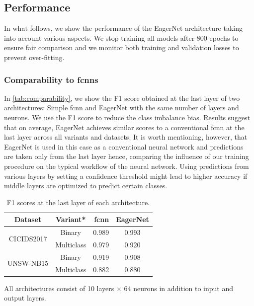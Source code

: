 \documentclass[conference]{IEEEtran}
\newcommand{\mynote}[3]{
    \fbox{\bfseries\sffamily\scriptsize#1}
    {\small$\blacktriangleright$\textsf{\emph{\color{#3}{#2}}}$\blacktriangleleft$}}
\newcommand{\todo}[1]{\mynote{TODO}{#1}{red}}
\begin{document}
\subsection{Performance}

In what follows, we show the performance of the EagerNet architecture taking into account various aspects. We stop training all models after 800 epochs to ensure fair comparison and we monitor both training and validation losses to prevent over-fitting.

\subsubsection{Comparability to \glspl{fcnn}}
\label{subsubsec:comparability_to_fnns}

In \autoref{tab:comparability}, we show the F1 score obtained at the last layer of two architectures: Simple \gls{fcnn} and EagerNet with the same number of layers and neurons. We use the F1 score to reduce the class imbalance bias. Results suggest that on average, EagerNet achieves similar scores to a conventional \gls{fcnn} at the last layer across all variants and datasets. It is worth mentioning, however, that EagerNet is used in this case as a conventional neural network and predictions are taken only from the last layer hence, comparing the influence of our training procedure on the typical workflow of the neural network. Using predictions from various layers by setting a confidence threshold might lead to higher accuracy if middle layers are optimized to predict certain classes.

\begin{table}[H]

\centering
\begin{tabular}{ccrc}
\toprule
\textbf{Dataset} & \textbf{Variant*} & \textbf{\gls{fcnn}} & \textbf{EagerNet} \\
\midrule
\multirow{2}{*}{CICIDS2017} & Binary & 0.989 & 0.993 \\
 & Multiclass & 0.979 & 0.920 \\
\midrule
\multirow{2}{*}{UNSW-NB15} & Binary & 0.919 & 0.908 \\
 & Multiclass & 0.882 & 0.880 \\
\midrule

\end{tabular}
\vspace{1ex}

{\raggedright * All architectures consist of 10 layers $\times$ 64 neurons in addition to input and output layers. \par}
\caption{F1 scores at the last layer of each architecture.}
\label{tab:comparability}
\end{table}
\end{document}
